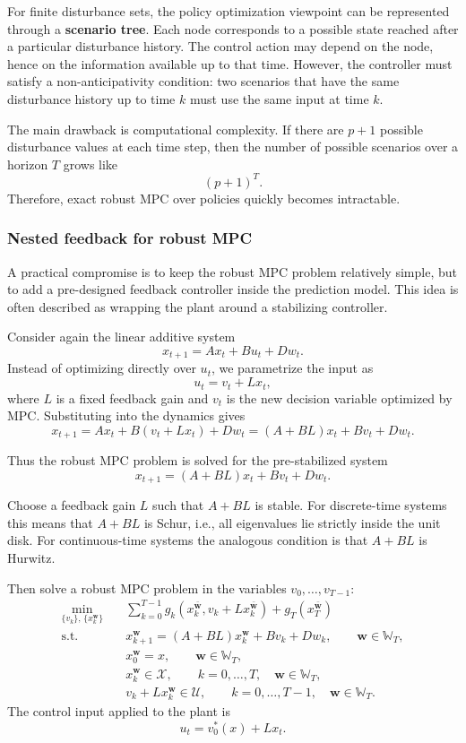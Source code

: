 For finite disturbance sets, the policy optimization viewpoint can be represented through a
\textbf{scenario tree}. Each node corresponds to a possible state reached after a particular
disturbance history. The control action may depend on the node, hence on the information
available up to that time. However, the controller must satisfy a non-anticipativity condition:
two scenarios that have the same disturbance history up to time $k$ must use the same input
at time $k$.

The main drawback is computational complexity. If there are $p+1$ possible disturbance values
at each time step, then the number of possible scenarios over a horizon $T$ grows like
\[
(p+1)^T.
\]
Therefore, exact robust MPC over policies quickly becomes intractable.

\subsubsection{Nested feedback for robust MPC}

A practical compromise is to keep the robust MPC problem relatively simple, but to add a
pre-designed feedback controller inside the prediction model. This idea is often described as
wrapping the plant around a stabilizing controller.

Consider again the linear additive system
\[
x_{t+1}=Ax_t+Bu_t+Dw_t.
\]
Instead of optimizing directly over $u_t$, we parametrize the input as
\[
u_t = v_t + Lx_t,
\]
where $L$ is a fixed feedback gain and $v_t$ is the new decision variable optimized by MPC.
Substituting into the dynamics gives
\[
x_{t+1}
= A x_t+B(v_t+Lx_t)+Dw_t
= (A+BL)x_t+Bv_t+Dw_t.
\]

Thus the robust MPC problem is solved for the pre-stabilized system
\[
x_{t+1}=(A+BL)x_t+Bv_t+Dw_t.
\]

\begin{theorembox}
Choose a feedback gain $L$ such that $A+BL$ is stable. For discrete-time systems this means
that $A+BL$ is Schur, i.e., all eigenvalues lie strictly inside the unit disk. For continuous-time
systems the analogous condition is that $A+BL$ is Hurwitz.

Then solve a robust MPC problem in the variables $v_0,\dots,v_{T-1}$:
\begin{align*}
\min_{\{v_k\},\,\{x_k^{\mathbf w}\}} \quad
& \sum_{k=0}^{T-1} g_k\left(x_k^{\bar{\mathbf w}},v_k+Lx_k^{\bar{\mathbf w}}\right)
+ g_T\left(x_T^{\bar{\mathbf w}}\right)\\
\text{s.t.}\quad
& x_{k+1}^{\mathbf w}
= (A+BL)x_k^{\mathbf w}+Bv_k+Dw_k,
\qquad \mathbf w\in\mathbb W_T,\\
& x_0^{\mathbf w}=x,
\qquad \mathbf w\in\mathbb W_T,\\
& x_k^{\mathbf w}\in\mathcal X,
\qquad k=0,\dots,T,\quad \mathbf w\in\mathbb W_T,\\
& v_k+Lx_k^{\mathbf w}\in\mathcal U,
\qquad k=0,\dots,T-1,\quad \mathbf w\in\mathbb W_T.
\end{align*}
The control input applied to the plant is
\[
u_t=v_0^*(x)+Lx_t.
\]
\end{theorembox}

